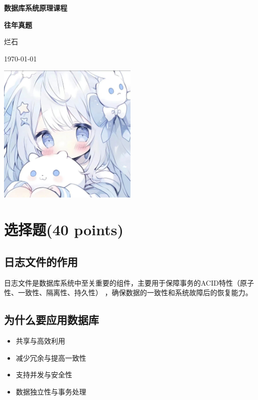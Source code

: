 \documentclass[a4paper,12pt,UTF8,fontset=none]{ctexart}
\begin{document}
\begin{titlepage}
    \centering
    \vspace*{\fill}
    {\LARGE\bfseries 数据库系统原理课程\par}
    \vspace{2cm}
    {\Huge\bfseries 往年真题\par}
    \vspace{2cm}
    {\Large 烂石\par}
    \vspace{1cm}
    {\large \today \par}
    \vspace{4cm}
    \includegraphics[width=0.5\textwidth]{static/images/logo.jpg}
    \vspace*{\fill}
    \thispagestyle{empty} %
    \newpage
\end{titlepage}

\section{选择题(40 points)}
\subsection{日志文件的作用}
日志文件是数据库系统中至关重要的组件，主要用于保障事务的ACID特性（原子性、一致性、隔离性、持久性） ，确保数据的一致性和系统故障后的恢复能力。
\subsection{为什么要应用数据库}
\begin{itemize}
    \item 共享与高效利用
    \item 减少冗余与提高一致性
    \item 支持并发与安全性
    \item 数据独立性与事务处理
\end{itemize}
\end{document}
